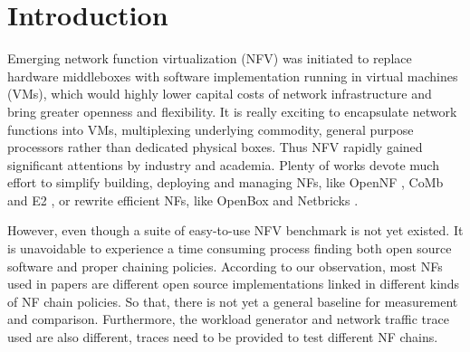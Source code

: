 \section{Introduction}
Emerging network function virtualization (NFV) was initiated to replace hardware middleboxes with software implementation running in virtual machines (VMs), which would highly lower capital costs of network infrastructure and bring greater openness and flexibility.
It is really exciting to encapsulate network functions into VMs, multiplexing underlying commodity, general purpose processors rather than dedicated physical boxes.
Thus NFV rapidly gained significant attentions by industry and academia. Plenty of works devote much effort to simplify building, deploying and managing NFs, like OpenNF \cite{gember-jacobson_opennf:_2014}, CoMb \cite{180672} and E2 \cite{palkar_e2:_2015}, or rewrite efficient NFs, like OpenBox \cite{bremler-barr_openbox:_2016} and Netbricks \cite{199352}.



However, even though a suite of easy-to-use NFV benchmark is not yet existed. It is unavoidable to experience a time consuming process finding both open source software and proper chaining policies. According to our observation, most NFs used in papers are different open source implementations linked in different kinds of NF chain policies. So that, there is not yet a general baseline for measurement and comparison. Furthermore, the workload generator and network traffic trace used are also different, traces need to be provided to test different NF chains.

